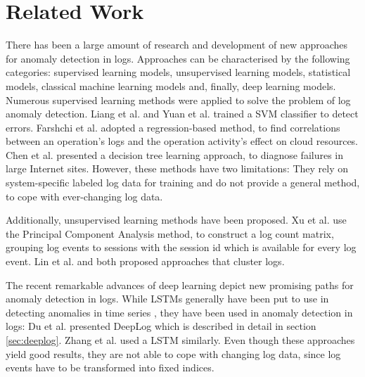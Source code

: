\chapter{Related Work\label{cha:related_work}}


There has been a large amount of research and development of new approaches for anomaly detection in logs. %
Approaches can be characterised by the following categories: supervised learning models, unsupervised learning models, statistical models, classical machine learning models and, finally, deep learning models.
Numerous supervised learning methods were applied to solve the problem of log anomaly detection. Liang et al. \cite{liang2007failure} and Yuan et al. \cite{yuan2006automated} trained a SVM classifier to detect errors. Farshchi et al. \cite{farshchi2015anomaly} adopted a regression-based method, to find correlations between an operation's logs and the operation activity's effect on cloud resources. Chen et al. \cite{chen2004failure} presented a decision tree learning approach, to diagnose failures in large Internet sites. However, these methods have two limitations: They rely on system-specific labeled log data for training and do not provide a general method, to cope with ever-changing log data.

Additionally, unsupervised learning methods have been proposed. Xu et al. \cite{xu2009detecting} use the Principal Component Analysis method, to construct a log count matrix, grouping log events to sessions with the session id which is available for every log event. Lin et al. \cite{lin2016log} and \cite{vaarandi2003data} both proposed approaches that cluster logs.

The recent remarkable advances of deep learning depict new promising paths for anomaly detection in logs. While LSTMs generally have been put to use in detecting anomalies in time series \cite{malhotra2015long}, they have been used in anomaly detection in logs: Du et al. \cite{du2017deeplog} presented DeepLog which is described in detail in section \ref{sec:deeplog}. Zhang et al. \cite{zhang2016automated} used a LSTM similarly. Even though these approaches yield good results, they are not able to cope with changing log data, since log events have to be transformed into fixed indices.

